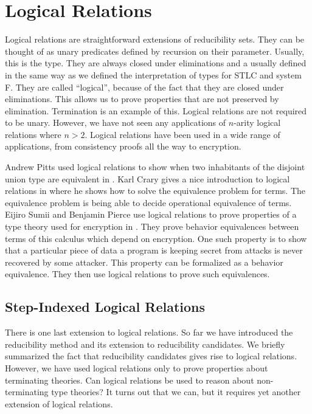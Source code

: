 



\section{Logical Relations}
\label{sec:logical_relations}
Logical relations are straightforward extensions of reducibility sets.
They can be thought of as unary predicates defined by recursion on
their parameter.  Usually, this is the type.  They are always closed
under eliminations and a usually defined in the same way as we defined
the interpretation of types for STLC and system F.  They are called
``logical'', because of the fact that they are closed under
eliminations.  This allows us to prove properties that are not
preserved by elimination.  Termination is an example of this.  Logical
relations are not required to be unary.  However, we have not seen any
applications of $n$-arity logical relations where $n > 2$.  Logical
relations have been used in a wide range of applications, from
consistency proofs all the way to encryption.

Andrew Pitts used logical relations to show when two inhabitants of
the disjoint union type are equivalent in \cite{Pitts:1998}.  Karl
Crary gives a nice introduction to logical relations in
\cite{Pierce:2004} where he shows how to solve the equivalence problem
for terms.  The equivalence problem is being able to decide
operational equivalence of terms.  Eijiro Sumii and Benjamin Pierce
use logical relations to prove properties of a type theory used for
encryption in \cite{Sumii:2003}.  They prove behavior equivalences
between terms of this calculus which depend on encryption.  One such
property is to show that a particular piece of data a program is
keeping secret from attacks is never recovered by some attacker.  This
property can be formalized as a behavior equivalence.  They then use
logical relations to prove such equivalences.

\subsection{Step-Indexed Logical Relations}
\label{sec:step_indexed_logical_relations}
There is one last extension to logical relations.  So far we have
introduced the reducibility method and its extension to reducibility
candidates.  We briefly summarized the fact that reducibility
candidates gives rise to logical relations.  However, we have used
logical relations only to prove properties about terminating theories.
Can logical relations be used to reason about non-terminating type
theories?  It turns out that we can, but it requires yet another
extension of logical relations.

